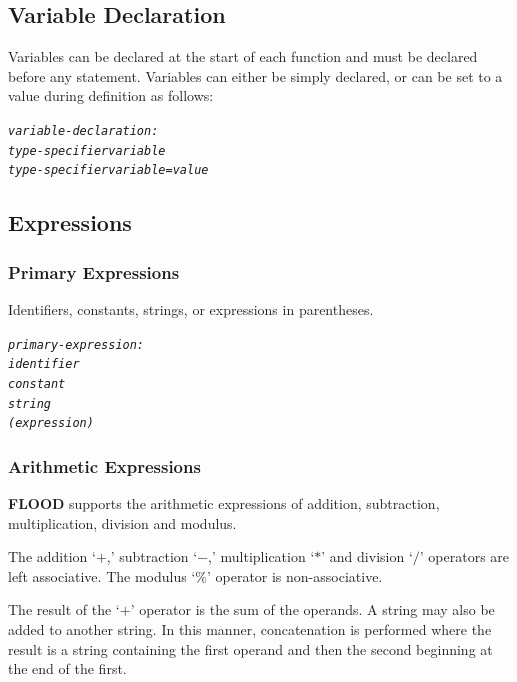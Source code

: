 \documentclass[12pt]{report}
\begin{document}
\subsection{Variable Declaration}

Variables can be declared at the start of each function and must be declared before any statement. Variables can either be simply declared, or can be set to a value during definition as follows:

\begin{alltt}\begin{singlespace}
         \textit{variable-declaration:}
              \textit{type-specifier variable}
              \textit{type-specifier variable = value}\end{singlespace}
\end{alltt}

\subsection{Expressions}

\subsubsection{Primary Expressions}

Identifiers, constants, strings, or expressions in parentheses.

\begin{alltt}\begin{singlespace}
         \textit{primary-expression:}
            \textit{identifier}
            \textit{constant}
            \textit{string}
            \textit{( expression )}\end{singlespace}
\end{alltt}

\subsubsection{Arithmetic Expressions}

\textbf{FLOOD} supports the arithmetic expressions of addition, subtraction, multiplication, division and modulus.

The addition `$+$,' subtraction `$-$,' multiplication `$*$' and division `$/$' operators are left associative. The modulus `$\%$' operator is non-associative.

The result of the `$+$' operator is the sum of the operands. A string may also be added to another string. In this manner, concatenation is performed where the result is a string containing the first operand and then the second beginning at the end of the first.
\end{document}
